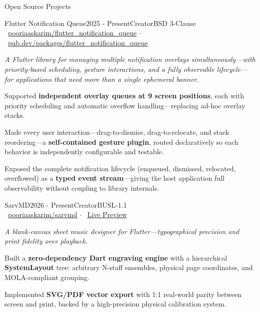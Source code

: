 \documentclass[
	a4paper, %
	12pt, %
]{resume} %
\begin{document}
\begin{rSection}{Open Source Projects}
    \begin{rSubsection}{Flutter Notification Queue}{2025 - Present}{Creator}{BSD 3-Clause 
		\\{\footnotesize\textcolor{bluegray}{\faGithubAlt~\href{https://github.com/pooriaaskarim/flutter_notification_queue}{pooriaaskarim/flutter\_notification\_queue} $\cdot$ \faCube~\href{https://pub.dev/packages/flutter_notification_queue}{pub.dev/packages/flutter\_notification\_queue}}}}
		\item[] {\small\textit{A Flutter library for managing multiple notification overlays simultaneously---with priority-based scheduling, gesture interactions, and a fully observable lifecycle---for applications that need more than a single ephemeral banner.}}
		\item Supported \textbf{independent overlay queues at 9 screen positions}, each with priority scheduling and automatic overflow handling---replacing ad-hoc overlay stacks.
		\item Made every user interaction---drag-to-dismiss, drag-to-relocate, and stack reordering---a \textbf{self-contained gesture plugin}, routed declaratively so each behavior is independently configurable and testable.
		\item Exposed the complete notification lifecycle (enqueued, dismissed, relocated, overflowed) as a \textbf{typed event stream}---giving the host application full observability without coupling to library internals.
        \\     
	\end{rSubsection}

    \begin{rSubsection}{SarvMD}{2026 - Present}{Creator}{BUSL-1.1
		\\ {\footnotesize\textcolor{bluegray}{\faGithubAlt~\href{https://github.com/pooriaaskarim/sarvmd}{pooriaaskarim/sarvmd} $\cdot$ \faDesktop~\href{https://pooriaaskarim.github.io/sarvmd}{Live Preview}}}}
		\item[] {\small\textit{A blank-canvas sheet music designer for Flutter---typographical precision and print fidelity over playback.}}
		\item Built a \textbf{zero-dependency Dart engraving engine} with a hierarchical \textbf{SystemLayout} tree: arbitrary N-staff ensembles, physical page coordinates, and MOLA-compliant grouping.
		\item Implemented \textbf{SVG/PDF vector export} with 1:1 real-world parity between screen and print, backed by a high-precision physical calibration system.
        \\    
	\end{rSubsection}
\end{rSection}
\end{document}
